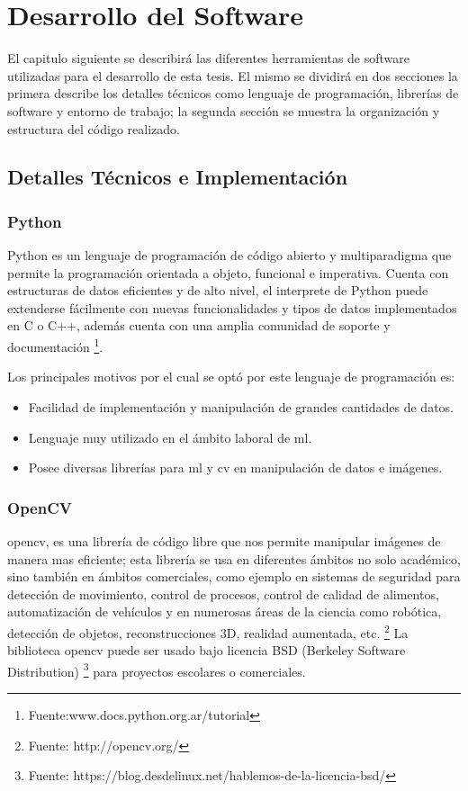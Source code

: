 \section*{Desarrollo del Software}\label{sec:Desarrollo}

El capitulo siguiente se describirá las diferentes herramientas de software utilizadas para el desarrollo de esta tesis. El mismo se dividirá en dos secciones la primera describe los detalles técnicos como lenguaje de programación, librerías de software y entorno de trabajo; la segunda sección se muestra la organización y estructura del código realizado.


\subsection*{Detalles Técnicos e Implementación}\label{sec:implementacion}

\subsubsection*{Python}
Python es un lenguaje de programación de código abierto y multiparadigma que permite la programación orientada a objeto, funcional e imperativa. 
Cuenta con estructuras de datos eficientes y de alto nivel, el interprete de Python puede extenderse fácilmente  con nuevas funcionalidades y tipos 
de  datos implementados en C o C++, además cuenta con una amplia comunidad de soporte y 
documentación \footnote{Fuente:www.docs.python.org.ar/tutorial}. 

Los principales motivos por el cual se optó por este lenguaje de programación es:
\begin{itemize}
 \item Facilidad de implementación y manipulación de grandes cantidades de datos.
 \item Lenguaje muy utilizado en el ámbito laboral de \ac{ml}.
 \item Posee diversas librerías para \ac{ml} y \ac{cv} en manipulación de datos e imágenes.
\end{itemize}


\subsubsection*{OpenCV}
\ac{opencv}, es una librería de código libre que nos permite manipular imágenes de manera mas eficiente; esta librería se usa en diferentes ámbitos no solo académico, sino también en ámbitos comerciales, como ejemplo en sistemas de seguridad para detección de movimiento, control de procesos, control de calidad de alimentos, automatización de vehículos y en numerosas áreas de la ciencia como robótica, detección de objetos, reconstrucciones 3D, realidad aumentada, etc. \footnote{Fuente: http://opencv.org/} La biblioteca \ac{opencv} puede ser usado bajo licencia BSD (Berkeley Software Distribution) \footnote{Fuente: https://blog.desdelinux.net/hablemos-de-la-licencia-bsd/ } para proyectos escolares o comerciales. 

